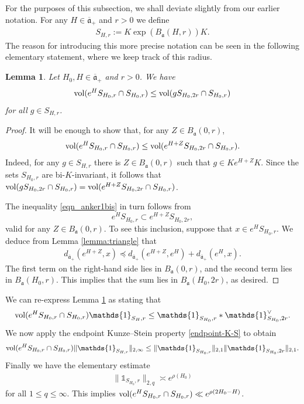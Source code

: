 \documentclass[12pt]{amsart}
\newtheorem{lemma}[theorem]{Lemma}
\theoremstyle{remark}
\newcommand{\ga}{\mathfrak a}
\begin{document}
For the purposes of this subsection, we shall deviate slightly from our earlier notation. For any $H\in\overline{\ga}_+$ and $r>0$ we define
\begin{gather*}
    S_{H, r} := K \exp(B_{\ga}(H, r))K.
\end{gather*}
The reason for introducing this more precise notation can be seen in the following elementary statement, where we keep track of this radius.
\begin{lemma}\label{eqn_anker1}
Let $H_0, H \in \overline{\ga}_+$ and $r>0$. We have
\[
    \textnormal{vol}(e^H S_{H_0, r} \cap S_{H_0, r}) \leq \textnormal{vol}(g S_{H_0, 2r} \cap S_{H_0, r})
\]
for all $g \in S_{H, r}$.
\end{lemma}

\begin{proof}
It will be enough to show that, for any $Z \in B_{\ga}(0, r)$,
\begin{equation}\label{eqn_anker1bis}
\textnormal{vol}(e^H S_{H_0, r} \cap S_{H_0, r}) \leq \textnormal{vol}(e^{H+Z} S_{H_0, 2r} \cap S_{H_0, r}).
\end{equation}
Indeed, for any $g \in S_{H, r}$ there is $Z \in B_{\ga}(0, r)$ such that $g\in Ke^{H+Z} K$. Since the sets $S_{H_0, r}$ are bi-$K$-invariant, it follows that $\textnormal{vol}(g S_{H_0, 2r} \cap S_{H_0, r}) = \textnormal{vol}(e^{H+Z} S_{H_0, 2r} \cap S_{H_0, r})$.

The inequality \eqref{eqn_anker1bis} in turn follows from
\[
e^H S_{H_0, r} \subset e^{H+Z} S_{H_0, 2r},
\]
valid for any $Z \in B_{\ga}(0, r)$. To see this inclusion, suppose that $x \in e^H S_{H_0, r}$. We deduce from Lemma \ref{lemma:triangle} that
\begin{gather*}
    d_{\overline{\ga}_+}(e^{H + Z}, x) \preceq d_{\overline{\ga}_+}(e^{H+Z}, e^H) + d_{\overline{\ga}_+}(e^H, x).
\end{gather*}
The first term on the right-hand side lies in $B_{\ga}(0, r)$, and the second term lies in $B_{\ga}(H_0, r)$. This implies that the sum lies in $B_{\ga}(H_0, 2r)$, as desired.
\end{proof}

We can re-express Lemma \ref{eqn_anker1} as stating that
\begin{gather*}
    \textnormal{vol}(e^H S_{H_0, r} \cap S_{H_0, r}) \mathds{1}_{S_{H}, r} \leq \mathds{1}_{S_{H_0}, r} * \mathds{1}_{S_{H_0}, 2r}^\vee.
\end{gather*}
We now apply the endpoint Kunze--Stein property \eqref{endpoint-K-S} to obtain
\begin{gather*}
    \textnormal{vol}(e^H S_{H_0, r} \cap S_{H_0, r}) \| \mathds{1}_{S_{H, r}}\|_{2, \infty} \leq \|\mathds{1}_{S_{H_0, r}}\|_{2, 1}  \|\mathds{1}_{S_{H_0}, 2r}\|_{2, 1}.
\end{gather*}
Finally we have the elementary estimate
\begin{gather*}
    \| \mathds{1}_{S_{H_0}, r} \|_{2, q} \asymp e^{\rho(H_0)}
\end{gather*}
for all $1 \leq q \leq \infty$. This implies $\textnormal{vol}(e^H S_{H_0, r} \cap S_{H_0, r}) \ll e^{\rho(2 H_0 - H)}$. 
\end{document}
